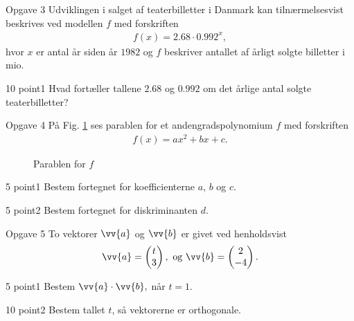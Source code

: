 \documentclass[12pt,x11names]{article}
\begin{document}
\begin{opgavetekst}{Opgave 3}
Udviklingen i salget af teaterbilletter i Danmark kan tilnærmelsesvist beskrives ved modellen $f$ med forskriften
\begin{align*}
f(x) = 2.68\cdot 0.992^x,
\end{align*}
hvor $x$ er antal år siden år $1982$ og $f$ beskriver antallet af årligt solgte billetter i mio. 
\end{opgavetekst}
\begin{delopgave}{10 point}{1}
Hvad fortæller tallene $2.68$ og $0.992$ om det årlige antal solgte teaterbilletter?
\end{delopgave}

\begin{opgavetekst}{Opgave 4}
På Fig. \ref{fig:poly} ses parablen for et andengradspolynomium $f$ med forskriften
\begin{align*}
f(x) = ax^2+bx+c.
\end{align*}
\begin{figure}[H]
\centering
{}
\caption{Parablen for $f$}
\label{fig:poly}
\end{figure} \phantom{h}
\end{opgavetekst}

\begin{delopgave}{5 point}{1}
Bestem fortegnet for koefficienterne $a$, $b$ og $c$.
\end{delopgave}
\begin{delopgave}{5 point}{2}
Bestem fortegnet for diskriminanten $d$. 
\end{delopgave}


\begin{opgavetekst}{Opgave 5}
To vektorer $\vv{a}$ og $\vv{b}$ er givet ved henholdsvist
\begin{align*}
\vv{a} = \begin{pmatrix} t \\ 3
\end{pmatrix}, \ \textnormal{og} \ \vv{b} = \begin{pmatrix}2 \\ -4
\end{pmatrix}.
\end{align*}
\end{opgavetekst}
\begin{delopgave}{5 point}{1}
Bestem $\vv{a} \cdot \vv{b},$ når $t = 1$. 
\end{delopgave}
\begin{delopgave}{10 point}{2}
Bestem tallet $t$, så vektorerne er orthogonale.
\end{delopgave}
\end{document}
